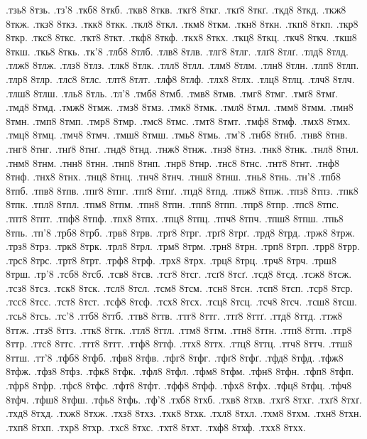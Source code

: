 {.тзь8
8тзь.
.тз'8
.ткб8
8ткб.
.ткв8
8ткв.
.ткг8
8ткг.
.ткґ8
8ткґ.
.ткд8
8ткд.
.ткж8
8ткж.
.ткз8
8ткз.
.ткк8
8ткк.
.ткл8
8ткл.
.ткм8
8ткм.
.ткн8
8ткн.
.ткп8
8ткп.
.ткр8
8ткр.
.ткс8
8ткс.
.ткт8
8ткт.
.ткф8
8ткф.
.ткх8
8ткх.
.ткц8
8ткц.
.ткч8
8ткч.
.ткш8
8ткш.
.ткь8
8ткь.
.тк'8
.тлб8
8тлб.
.тлв8
8тлв.
.тлг8
8тлг.
.тлґ8
8тлґ.
.тлд8
8тлд.
.тлж8
8тлж.
.тлз8
8тлз.
.тлк8
8тлк.
.тлл8
8тлл.
.тлм8
8тлм.
.тлн8
8тлн.
.тлп8
8тлп.
.тлр8
8тлр.
.тлс8
8тлс.
.тлт8
8тлт.
.тлф8
8тлф.
.тлх8
8тлх.
.тлц8
8тлц.
.тлч8
8тлч.
.тлш8
8тлш.
.тль8
8тль.
.тл'8
.тмб8
8тмб.
.тмв8
8тмв.
.тмг8
8тмг.
.тмґ8
8тмґ.
.тмд8
8тмд.
.тмж8
8тмж.
.тмз8
8тмз.
.тмк8
8тмк.
.тмл8
8тмл.
.тмм8
8тмм.
.тмн8
8тмн.
.тмп8
8тмп.
.тмр8
8тмр.
.тмс8
8тмс.
.тмт8
8тмт.
.тмф8
8тмф.
.тмх8
8тмх.
.тмц8
8тмц.
.тмч8
8тмч.
.тмш8
8тмш.
.тмь8
8тмь.
.тм'8
.тнб8
8тнб.
.тнв8
8тнв.
.тнг8
8тнг.
.тнґ8
8тнґ.
.тнд8
8тнд.
.тнж8
8тнж.
.тнз8
8тнз.
.тнк8
8тнк.
.тнл8
8тнл.
.тнм8
8тнм.
.тнн8
8тнн.
.тнп8
8тнп.
.тнр8
8тнр.
.тнс8
8тнс.
.тнт8
8тнт.
.тнф8
8тнф.
.тнх8
8тнх.
.тнц8
8тнц.
.тнч8
8тнч.
.тнш8
8тнш.
.тнь8
8тнь.
.тн'8
.тпб8
8тпб.
.тпв8
8тпв.
.тпг8
8тпг.
.тпґ8
8тпґ.
.тпд8
8тпд.
.тпж8
8тпж.
.тпз8
8тпз.
.тпк8
8тпк.
.тпл8
8тпл.
.тпм8
8тпм.
.тпн8
8тпн.
.тпп8
8тпп.
.тпр8
8тпр.
.тпс8
8тпс.
.тпт8
8тпт.
.тпф8
8тпф.
.тпх8
8тпх.
.тпц8
8тпц.
.тпч8
8тпч.
.тпш8
8тпш.
.тпь8
8тпь.
.тп'8
.трб8
8трб.
.трв8
8трв.
.трг8
8трг.
.трґ8
8трґ.
.трд8
8трд.
.трж8
8трж.
.трз8
8трз.
.трк8
8трк.
.трл8
8трл.
.трм8
8трм.
.трн8
8трн.
.трп8
8трп.
.трр8
8трр.
.трс8
8трс.
.трт8
8трт.
.трф8
8трф.
.трх8
8трх.
.трц8
8трц.
.трч8
8трч.
.трш8
8трш.
.тр'8
.тсб8
8тсб.
.тсв8
8тсв.
.тсг8
8тсг.
.тсґ8
8тсґ.
.тсд8
8тсд.
.тсж8
8тсж.
.тсз8
8тсз.
.тск8
8тск.
.тсл8
8тсл.
.тсм8
8тсм.
.тсн8
8тсн.
.тсп8
8тсп.
.тср8
8тср.
.тсс8
8тсс.
.тст8
8тст.
.тсф8
8тсф.
.тсх8
8тсх.
.тсц8
8тсц.
.тсч8
8тсч.
.тсш8
8тсш.
.тсь8
8тсь.
.тс'8
.ттб8
8ттб.
.ттв8
8ттв.
.ттг8
8ттг.
.ттґ8
8ттґ.
.ттд8
8ттд.
.ттж8
8ттж.
.ттз8
8ттз.
.ттк8
8ттк.
.ттл8
8ттл.
.ттм8
8ттм.
.ттн8
8ттн.
.ттп8
8ттп.
.ттр8
8ттр.
.ттс8
8ттс.
.ттт8
8ттт.
.ттф8
8ттф.
.ттх8
8ттх.
.ттц8
8ттц.
.ттч8
8ттч.
.ттш8
8ттш.
.тт'8
.тфб8
8тфб.
.тфв8
8тфв.
.тфг8
8тфг.
.тфґ8
8тфґ.
.тфд8
8тфд.
.тфж8
8тфж.
.тфз8
8тфз.
.тфк8
8тфк.
.тфл8
8тфл.
.тфм8
8тфм.
.тфн8
8тфн.
.тфп8
8тфп.
.тфр8
8тфр.
.тфс8
8тфс.
.тфт8
8тфт.
.тфф8
8тфф.
.тфх8
8тфх.
.тфц8
8тфц.
.тфч8
8тфч.
.тфш8
8тфш.
.тфь8
8тфь.
.тф'8
.тхб8
8тхб.
.тхв8
8тхв.
.тхг8
8тхг.
.тхґ8
8тхґ.
.тхд8
8тхд.
.тхж8
8тхж.
.тхз8
8тхз.
.тхк8
8тхк.
.тхл8
8тхл.
.тхм8
8тхм.
.тхн8
8тхн.
.тхп8
8тхп.
.тхр8
8тхр.
.тхс8
8тхс.
.тхт8
8тхт.
.тхф8
8тхф.
.тхх8
8тхх.
}
